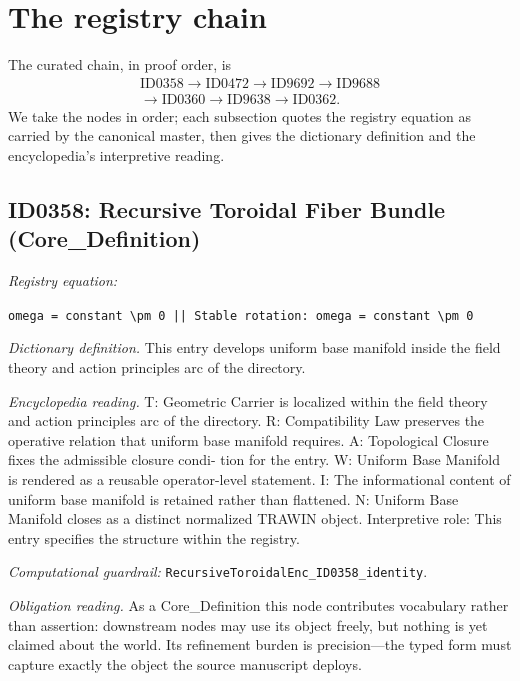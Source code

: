 \documentclass[11pt]{article}
\theoremstyle{remark}
\begin{document}
\section{The registry chain}
\label{sec:chain}

The curated chain, in proof order, is
\begin{equation*}
\begin{gathered}
\text{ID0358} \to \text{ID0472} \to \text{ID9692} \to \text{ID9688} \\
\to \text{ID0360} \to \text{ID9638} \to \text{ID0362}.
\end{gathered}
\end{equation*}
We take the nodes in order; each subsection quotes the registry equation as carried by the canonical master, then gives the dictionary definition and the encyclopedia's interpretive reading.

\subsection{ID0358: Recursive Toroidal Fiber Bundle (Core\_Definition)}

\noindent\textit{Registry equation:}\par
{\small\texttt{omega = constant \textbackslash{}pm 0 || Stable rotation: omega = constant \textbackslash{}pm 0}}\par\medskip
\noindent\textit{Dictionary definition.} This entry develops uniform base manifold inside the field theory and action principles arc of the directory.\par\medskip
\noindent\textit{Encyclopedia reading.} T: Geometric Carrier is localized within the field theory and action principles arc of the directory. R: Compatibility Law preserves the operative relation that uniform base manifold requires. A: Topological Closure fixes the admissible closure condi- tion for the entry. W: Uniform Base Manifold is rendered as a reusable operator-level statement. I: The informational content of uniform base manifold is retained rather than flattened. N: Uniform Base Manifold closes as a distinct normalized TRAWIN object. Interpretive role: This entry specifies the structure within the registry.
\par\medskip\noindent\textit{Computational guardrail:} \texttt{RecursiveToroidalEnc\_ID0358\_identity}.
\par\medskip\noindent\textit{Obligation reading.} As a Core\_Definition this node contributes vocabulary rather than assertion: downstream nodes may use its object freely, but nothing is yet claimed about the world. Its refinement burden is precision---the typed form must capture exactly the object the source manuscript deploys.
\end{document}

